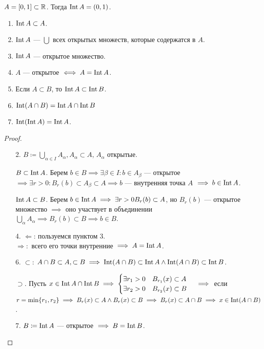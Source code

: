 \begin{example}
    $A = [0, 1] \subset \mathbb{R}$. Тогда  $\operatorname{Int} A = (0, 1)$.
\end{example}
\begin{properties}[внутренности]
    \begin{enumerate}
        \item $\operatorname{Int} A \subset A$.
        \item  $\operatorname{Int} A$ ---  $\bigcup$ всех открытых множеств, которые содержатся в  $A$.
        \item $\operatorname{Int} A$ --- открытое множество. 
        \item  $A$ ---  открытое $\iff A = \operatorname{Int} A$.
        \item Если $A \subset B$, то $\operatorname{Int} A \subset \operatorname{Int} B$.
        \item $\operatorname{Int}(A \cap B) = \operatorname{Int} A \cap \operatorname{Int} B$
        \item $\operatorname{Int}(\operatorname{Int} A) = \operatorname{Int} A$.
    \end{enumerate}
\end{properties}
\begin{proof}
    \slashn
    \begin{enumerate}
        \item[2.] $B \coloneqq \bigcup_{\alpha \in I} A_{\alpha}, A_\alpha \subset A$, $A_\alpha$ открытые.

      $B \subset \operatorname{Int} A$. Берем  $b \in B \implies \exists \beta \in I\!: b \in A_\beta$ --- открытое  $\implies \exists r > 0\!: B_r(b) \subset A_\beta \subset A \implies b$ --- внутренняя точка  $A$  $\implies b \in \operatorname{Int} A$.

      $\operatorname{Int} A \subset B$. Берем  $b \in \operatorname{Int} A \implies \exists r > 0 B_r(b) \subset A$, но  $B_r(b)$ --- открытое множество $\implies $ оно участвует в объединении  $\bigcup\limits_\alpha A_\alpha \implies B_r(b) \subset B \implies b \in B$.

      \item[4.] $\Leftarrow$: пользуемся пунктом 3.  \\$\Rightarrow:$ всего его точки внутренние  $\implies A = \operatorname{Int} A$.

      \item[6.] $\subset$:  $A \cap B \subset A, \subset B \implies \operatorname{Int}(A \cap B) \subset \operatorname{Int} A \land \operatorname{Int}(A \cap B) \subset \operatorname{Int} B$.

      $\supset$. Пусть $x \in \operatorname{Int} A \cap \operatorname{Int} B \implies \begin{cases} \exists r_1 > 0 \quad B_{r_1}(x) \subset A \\ \exists r_2 > 0 \quad B_{r_2}(x) \subset B \end{cases} \implies$ если $r = \min \{r_1, r_2 \} \implies B_r(x) \subset A \land B_r(x) \subset B \implies B_r(x) \subset A \cap B \implies x \in \operatorname{Int}(A \cap B)$.

      \item[7.] $B \coloneqq \operatorname{Int} A$ --- открытое $\implies B = \operatorname{Int} B$.
    \end{enumerate}
\end{proof}
